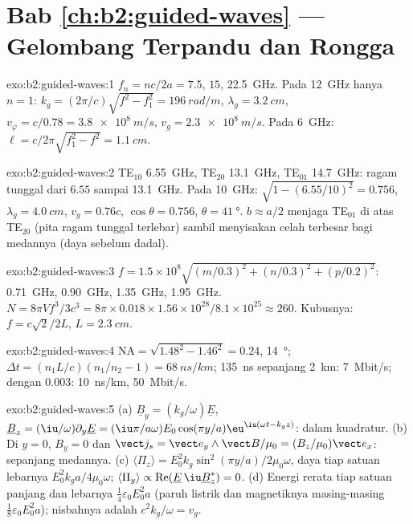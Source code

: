 \section*{Bab \ref{ch:b2:guided-waves} --- Gelombang Terpandu dan Rongga}

\begin{solution}{exo:b2:guided-waves:1}
$f_n = nc/2a = 7.5$, $15$, \qty{22.5}{GHz}. Pada \qty{12}{GHz} hanya $n = 1$: $k_g =
(2\pi/c)\sqrt{f^2 - f_1^2} = \qty{196}{rad/m}$, $\lambda_g = \qty{3.2}{cm}$, $v_\varphi = c/0.78
= \qty{3.8e8}{m/s}$, $v_g = \qty{2.3e8}{m/s}$. Pada \qty{6}{GHz}: $\ell = c/2\pi\sqrt{f_1^2 -
f^2} = \qty{1.1}{cm}$.
\end{solution}

\begin{solution}{exo:b2:guided-waves:2}
TE$_{10}$ \qty{6.55}{GHz}, TE$_{20}$ \qty{13.1}{GHz}, TE$_{01}$ \qty{14.7}{GHz}: ragam
tunggal dari $6.55$ sampai \qty{13.1}{GHz}. Pada \qty{10}{GHz}: $\sqrt{1 - (6.55/10)^2} =
0.756$, $\lambda_g = \qty{4.0}{cm}$, $v_g = 0.76c$, $\cos\theta = 0.756$, $\theta = \qty{41}{\degree}$.
$b \approx a/2$ menjaga TE$_{01}$ di atas TE$_{20}$ (pita ragam tunggal terlebar)
sambil menyisakan celah terbesar bagi medannya (daya sebelum dadal).
\end{solution}

\begin{solution}{exo:b2:guided-waves:3}
$f = 1.5 \times 10^8\sqrt{(m/0.3)^2 + (n/0.3)^2 + (p/0.2)^2}$: \qty{0.71}{GHz}, \qty{0.90}{GHz},
\qty{1.35}{GHz}, \qty{1.95}{GHz}. $N = 8\pi Vf^3/3c^3 = 8\pi \times 0.018 \times 1.56 \times 10^{28}/
8.1 \times 10^{25} \approx 260$. Kubusnya: $f = c\sqrt2/2L$, $L = \qty{2.3}{cm}$.
\end{solution}

\begin{solution}{exo:b2:guided-waves:4}
$\mathrm{NA} = \sqrt{1.48^2 - 1.46^2} = 0.24$, \qty{14}{\degree}; $\Delta t = (n_1L/c)(n_1/n_2
- 1) = \qty{68}{ns/km}$; \qty{135}{ns} sepanjang \qty{2}{km}: \qty{7}{Mbit/s}; dengan $0.003$:
\qty{10}{ns/km}, \qty{50}{Mbit/s}.
\end{solution}

\begin{solution}{exo:b2:guided-waves:5}
(a) $\underline B_y = (k_g/\omega)\underline E$, $\underline B_z = (\iu/\omega)\partial_y\underline E = (\iu\pi/a\omega)
E_0\cos(\pi y/a)\eu^{\iu(\omega t - k_gz)}$: dalam kuadratur. (b) Di $y = 0$, $B_y = 0$ dan
$\vect j_s = \vect e_y\wedge\vect B/\mu_0 = (B_z/\mu_0)\vect e_x$: sepanjang medannya. (c)
$\langle\Pi_z\rangle = E_0^2k_g\sin^2(\pi y/a)/2\mu_0\omega$, daya tiap satuan lebarnya
$E_0^2k_ga/4\mu_0\omega$; $\langle\Pi_y\rangle \propto \operatorname{Re}(\underline E\,\iu\underline B_z^*)
= 0$. (d) Energi rerata tiap satuan panjang dan lebarnya $\tfrac14\varepsilon_0E_0^2a$ (paruh listrik
dan magnetiknya masing-masing $\tfrac18\varepsilon_0E_0^2a$); nisbahnya adalah $c^2k_g/\omega = v_g$.
\end{solution}

